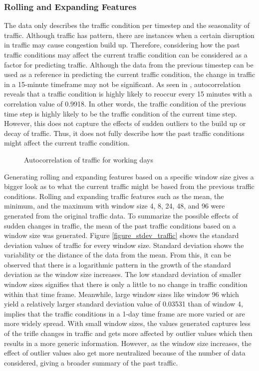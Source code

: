 \subsubsection{Rolling and Expanding Features}

The data only describes the traffic condition per timestep and the seasonality of traffic. Although traffic has pattern, there are instances when a certain disruption in traffic may cause congestion build up. Therefore, considering how the past traffic conditions may affect the current traffic condition can be considered as a factor for predicting traffic. Although the data from the previous timestep can be used as a reference in predicting the current traffic condition, the change in traffic in a 15-minute timeframe may not be significant. As seen in , autocorrelation reveals that a traffic condition is highly likely to reoccur every 15 minutes with a correlation value of 0.9918. In other words, the traffic condition of the previous time step is highly likely to be the traffic condition of the current time step. However, this does not capture the effects of sudden outliers to the build up or decay of traffic. Thus, it does not fully describe how the past traffic conditions might affect the current traffic condition. 

\begin{figure}
  \centering
  \captionsetup{justification=centering}
  \caption{Autocorrelation of traffic for working days}
  \label{figure_autocorr_traffic_workingdays}
\end{figure}

Generating rolling and expanding features based on a specific window size gives a bigger look as to what the current traffic might be based from the previous traffic conditions. Rolling and expanding traffic features such as the mean, the minimum, and the maximum with window size  4, 8, 24, 48, and 96 were generated from the original traffic data. To summarize the possible effects of sudden changes in traffic, the mean of the past traffic conditions based on a window size was generated. Figure \ref{figure_stdev_traffic} shows the standard deviation values of traffic for every window size. Standard deviation shows the variability or the distance of the data from the mean. From this, it can be observed that there is a logarithmic pattern in the growth of the standard deviation as the window size increases. The low standard deviation of smaller window sizes signifies that there is only a little to no change in traffic condition within that time frame. Meanwhile, large window sizes like window 96 which yield a relatively larger standard deviation value of 0.03531 than of window 4, implies that the traffic conditions in a 1-day time frame are more varied or are more widely spread. With small window sizes, the values generated captures less of the trifle changes in traffic and gets more affected by outlier values which then results in a more generic information. However, as the window size increases, the effect of outlier values also get more neutralized because of the number of data considered, giving a broader summary of the past traffic. 

